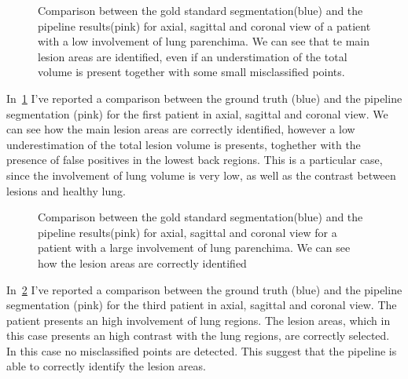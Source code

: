\documentclass{standalone}
\begin{document}
 		\begin{figure}[h!]
 		\centering
 			\caption{Comparison between the gold standard segmentation(blue) and the pipeline results(pink) for axial, sagittal and coronal view of a patient with a low involvement of lung parenchima. We can see that te main lesion areas are identified, even if an understimation of the total volume is present together with some small misclassified points.}\label{fig:pat1}
 		\end{figure}
 	
 	In \figurename\,\ref{fig:pat1} I've reported a comparison between the ground truth (blue) and the pipeline segmentation (pink) for the first patient in axial, sagittal and coronal view. We can see how the main lesion areas are correctly identified, however a low underestimation of the total lesion volume is presents, toghether with the presence of false positives in the lowest back regions. This is a particular case, since the involvement of lung volume is very low, as well as the contrast between lesions and healthy lung.
 	
 	
 		\begin{figure}[h!]
 			\centering
 		\caption{Comparison between the gold standard segmentation(blue) and the pipeline results(pink) for axial, sagittal and coronal view for a patient with a large involvement of lung parenchima. We can see how the lesion areas are correctly identified}\label{fig:pat3}
 		\end{figure}
 	
 	In \figurename\,\ref{fig:pat3} I've reported a comparison between the ground truth (blue) and the pipeline segmentation (pink) for the third patient in axial, sagittal and coronal view. The patient presents an high involvement of lung regions.  The lesion areas, which  in this case presents an high contrast with the lung regions, are correctly selected. In this case no misclassified points are detected. This suggest that the pipeline is able to correctly identify the lesion areas. 
 	
 	
	
\end{document}
